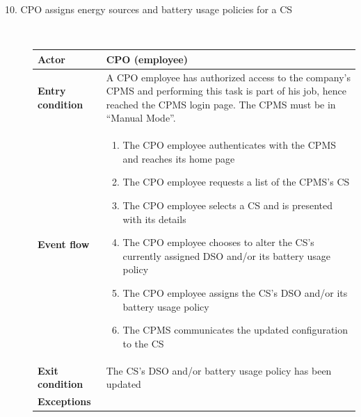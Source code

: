 \documentclass[11pt]{article}
\begin{document}
\begin{description}
    \newpage
    
    \item [10. CPO assigns energy sources and battery usage policies for a CS] \hfill \\
    \begin{table}[H]
        \centering
        \setlength{\tabcolsep}{18pt}
        \renewcommand{\arraystretch}{1.4}
        \begin{tabularx}{\textwidth}{|>{\hsize=0.5\hsize}X|>{\hsize=1.5\hsize}X|}
            \hline
            \textbf{Actor} & CPO (employee) \\
            \hline
            \textbf{Entry condition} & A CPO employee has authorized access to the company's CPMS and performing this task is part of his job, hence reached the CPMS login page. The CPMS must be in “Manual Mode”. \\
            \hline
            \textbf{Event flow} & 
                \begin{minipage}[t]{\hsize}
                \begin{enumerate}[topsep=0pt, leftmargin=*]
                    \item The CPO employee authenticates with the CPMS and reaches its home page
                    \item The CPO employee requests a list of the CPMS's CS
                    \item The CPO employee selects a CS and is presented with its details
                    \item The CPO employee chooses to alter the CS's currently assigned DSO and/or its battery usage policy
                    \item The CPO employee assigns the CS's DSO and/or its battery usage policy
                    \item The CPMS communicates the updated configuration to the CS
                \end{enumerate}
                \end{minipage}
                \vspace{6pt}
            \\
            \hline
            \textbf{Exit condition} & The CS's DSO and/or battery usage policy has been updated \\
            \hline
            \textbf{Exceptions} & 
                \begin{minipage}[t]{\hsize}
                \vspace{0pt}

\end{minipage}
\end{tabularx}
\end{table}
\end{description}
\end{document}
